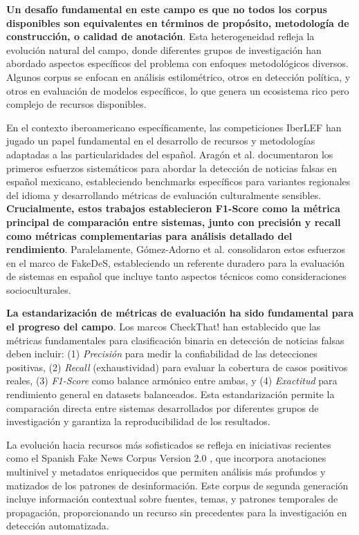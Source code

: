 \textbf{Un desafío fundamental en este campo es que no todos los corpus disponibles son equivalentes en términos de propósito, metodología de construcción, o calidad de anotación}. Esta heterogeneidad refleja la evolución natural del campo, donde diferentes grupos de investigación han abordado aspectos específicos del problema con enfoques metodológicos diversos. Algunos corpus se enfocan en análisis estilométrico, otros en detección política, y otros en evaluación de modelos específicos, lo que genera un ecosistema rico pero complejo de recursos disponibles.

En el contexto iberoamericano específicamente, las competiciones IberLEF han jugado un papel fundamental en el desarrollo de recursos y metodologías adaptadas a las particularidades del español. Aragón et al. \cite{aragon2020overview} documentaron los primeros esfuerzos sistemáticos para abordar la detección de noticias falsas en español mexicano, estableciendo benchmarks específicos para variantes regionales del idioma y desarrollando métricas de evaluación culturalmente sensibles. \textbf{Crucialmente, estos trabajos establecieron F1-Score como la métrica principal de comparación entre sistemas, junto con precisión y recall como métricas complementarias para análisis detallado del rendimiento}. Paralelamente, Gómez-Adorno et al. \cite{gomez2021overview} consolidaron estos esfuerzos en el marco de FakeDeS, estableciendo un referente duradero para la evaluación de sistemas en español que incluye tanto aspectos técnicos como consideraciones socioculturales.

\textbf{La estandarización de métricas de evaluación ha sido fundamental para el progreso del campo}. Los marcos CheckThat! \cite{barron2023clef} han establecido que las métricas fundamentales para clasificación binaria en detección de noticias falsas deben incluir: (1) \textit{Precisión} para medir la confiabilidad de las detecciones positivas, (2) \textit{Recall} (exhaustividad) para evaluar la cobertura de casos positivos reales, (3) \textit{F1-Score} como balance armónico entre ambas, y (4) \textit{Exactitud} para rendimiento general en datasets balanceados. Esta estandarización permite la comparación directa entre sistemas desarrollados por diferentes grupos de investigación y garantiza la reproducibilidad de los resultados.

La evolución hacia recursos más sofisticados se refleja en iniciativas recientes como el Spanish Fake News Corpus Version 2.0 \cite{ramirez2021spanish}, que incorpora anotaciones multinivel y metadatos enriquecidos que permiten análisis más profundos y matizados de los patrones de desinformación. Este corpus de segunda generación incluye información contextual sobre fuentes, temas, y patrones temporales de propagación, proporcionando un recurso sin precedentes para la investigación en detección automatizada.

